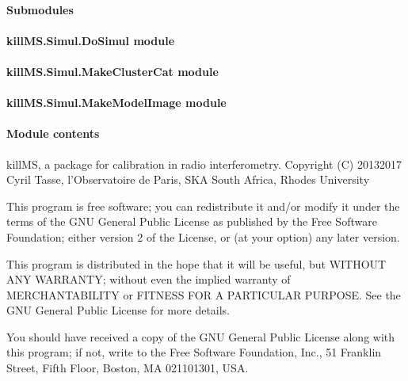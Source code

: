 \documentclass[letterpaper,10pt,english]{sphinxmanual}
\begin{document}
\paragraph{Submodules}
\label{\detokenize{api/killMS.Simul:submodules}}

\paragraph{killMS.Simul.DoSimul module}
\label{\detokenize{api/killMS.Simul:killms-simul-dosimul-module}}

\paragraph{killMS.Simul.MakeClusterCat module}
\label{\detokenize{api/killMS.Simul:killms-simul-makeclustercat-module}}

\paragraph{killMS.Simul.MakeModelImage module}
\label{\detokenize{api/killMS.Simul:killms-simul-makemodelimage-module}}

\paragraph{Module contents}
\label{\detokenize{api/killMS.Simul:module-killMS.Simul}}\label{\detokenize{api/killMS.Simul:module-contents}}
\sphinxAtStartPar
killMS, a package for calibration in radio interferometry.
Copyright (C) 2013\sphinxhyphen{}2017  Cyril Tasse, l’Observatoire de Paris,
SKA South Africa, Rhodes University

\sphinxAtStartPar
This program is free software; you can redistribute it and/or
modify it under the terms of the GNU General Public License
as published by the Free Software Foundation; either version 2
of the License, or (at your option) any later version.

\sphinxAtStartPar
This program is distributed in the hope that it will be useful,
but WITHOUT ANY WARRANTY; without even the implied warranty of
MERCHANTABILITY or FITNESS FOR A PARTICULAR PURPOSE.  See the
GNU General Public License for more details.

\sphinxAtStartPar
You should have received a copy of the GNU General Public License
along with this program; if not, write to the Free Software
Foundation, Inc., 51 Franklin Street, Fifth Floor, Boston, MA  02110\sphinxhyphen{}1301, USA.
\end{document}
